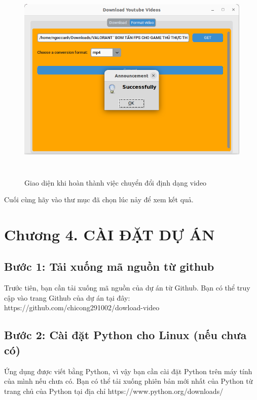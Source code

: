 \documentclass{article} %
\begin{document}
\begin{figure}[H]
    \centering
    \includegraphics[width=15cm, height=10cm]{images/tienhanh9.PNG}
    \caption{Giao diện khi hoàn thành việc chuyển đổi định dạng video}
    \label{fig:enter-label}
\end{figure}
Cuối cùng hãy vào thư mục đã chọn lúc nảy để xem kết quả.
\newpage

\section*{Chương 4. CÀI ĐẶT DỰ ÁN}
\setcounter{section}{4}
\setcounter{subsection}{0}
\subsection*{Bước 1: Tải xuống mã nguồn từ github}
Trước tiên, bạn cần tải xuống mã nguồn của dự án từ Github. Bạn có thể truy cập vào trang Github của dự án tại đây: https://github.com/chicong291002/dowload-video
\subsection*{Bước 2: Cài đặt Python cho Linux (nếu chưa có)}
Ứng dụng được viết bằng Python, vì vậy bạn cần cài đặt Python trên máy tính của mình nếu chưa có. Bạn có thể tải xuống phiên bản mới nhất của Python từ trang chủ của Python tại địa chỉ https://www.python.org/downloads/
\end{document}

